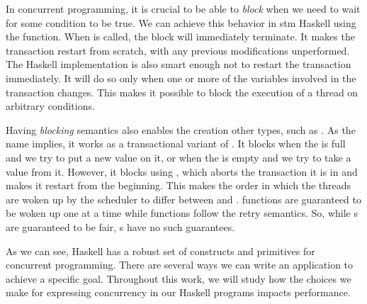 In concurrent programming, it is crucial to be able to \emph{block} when we need to wait for some condition to be true. We can achieve this behavior in \acs{stm} Haskell using the \retry function. When \retry is called, the \atomically block will immediately terminate. It makes the transaction restart from scratch, with any previous modifications unperformed. The Haskell implementation is also smart enough not to restart the transaction immediately. It will do so only when one or more of the variables involved in the transaction changes. This makes it possible to block the execution of a thread on arbitrary conditions.

Having \emph{blocking} semantics also enables the creation other types, such as \TMVar. As the name implies, it works as a transactional variant of \MVar. It blocks when the \TMVar is full and we try to put a new value on it, or when the \TMVar is empty and we try to take a value from it. However, it blocks using \retry, which aborts the transaction it is in and makes it restart from the beginning. This makes the order in which the threads are woken up by the scheduler to differ between \MVar and \TMVar. \MVar functions are guaranteed to be woken up one at a time while \TMVar functions follow the retry semantics. So, while {\MVar}s are guaranteed to be fair, {\TMVar}s have no such guarantees.

As we can see, Haskell has a robust set of constructs and primitives for concurrent programming. There are several ways we can write an application to achieve a specific goal. Throughout this work, we will study how the choices we make for expressing concurrency in our Haskell programs impacts performance.
